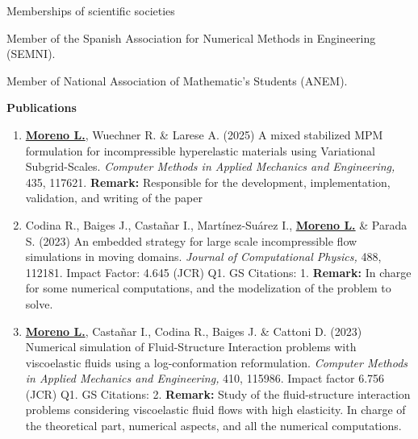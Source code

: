 \documentclass[letterpaper,english]{article}
\begin{document}
\begin{cv}{}
\begin{cvlist}{Memberships of scientific societies}
	\item[\footnotesize{Since 2019}] Member of the Spanish Association for Numerical Methods in Engineering (SEMNI). 
	\item[\footnotesize{Since 2011}] Member of National Association of Mathematic's Students (ANEM).
\end{cvlist}
\vspace{0.25cm}
\large{\textbf{Publications}}\\
\normalsize
\begin{enumerate}{}
    \item \textbf{\underline{Moreno L.}}, Wuechner R. \& Larese A. (2025)
    A mixed stabilized MPM formulation for incompressible hyperelastic materials using Variational Subgrid-Scales.  \textit{Computer Methods in Applied Mechanics and Engineering,} 435, 117621.
    \textbf{Remark:} Responsible for the development, implementation, validation, and writing of the paper
    
    \item Codina R., Baiges J., Castañar I., Martínez-Suárez I., \textbf{\underline{Moreno L.}} \& Parada S. 
    (2023)
    An embedded strategy for large scale incompressible flow simulations in moving domains. \textit{Journal of Computational Physics,} 488, 112181.
    Impact Factor: 4.645 (JCR) Q1. 
     GS Citations: 1.
    \textbf{Remark:} In charge for some numerical computations, and the modelization of the problem to solve.

    \item \textbf{\underline{Moreno L.}}, Castañar I., Codina R., Baiges J. \& Cattoni D. 
    (2023) 
    Numerical simulation of Fluid-Structure Interaction problems with viscoelastic fluids using a log-conformation reformulation. 
    \textit{Computer Methods in Applied Mechanics and Engineering,} 410, 115986. 
    Impact factor 6.756 (JCR) Q1.  
     GS Citations: 2. 
    \textbf{Remark:} Study of the fluid-structure interaction problems considering viscoelastic fluid flows with high elasticity. In charge of the theoretical part, numerical aspects, and all the numerical computations.
    

\end{enumerate}
\end{cv}
\end{document}
